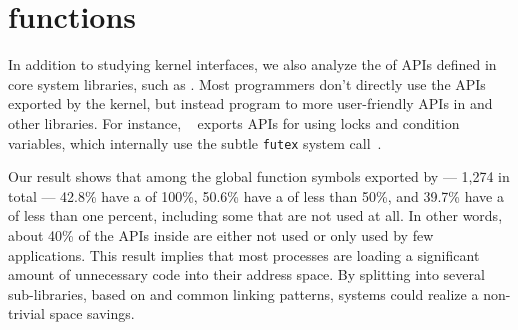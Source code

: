 


\section{\Libc{} functions}
\label{sec:study:libc}

In addition to studying kernel interfaces, we also analyze the \usagemetric{} of APIs
defined in core system libraries, such as \libc{}.
Most programmers don't directly use the APIs exported by the kernel,
but instead program to more user-friendly APIs in \libc{} and other libraries.
For instance, \glibc{}~\citep{glibc} exports APIs for using locks and condition variables, which internally 
use the subtle {\tt futex} system call~\citep{franke02futex}.

Our result shows that among %
the global function symbols exported by 
\libc{} --- 1,274 in total %
--- 42.8\% have a \usagemetric{} of 100\%,
50.6\% have a \usagemetric{} of less than 50\%,
and 39.7\% have a \usagemetric{} of less than one percent, including some that are not used at all.
In other words, about 40\% of the APIs inside \libc{}
are either not used or only used by few applications.
This result implies that most processes are loading a significant amount of 
unnecessary code into their address space.
By splitting \libc{} into several sub-libraries, based on \usagemetric{}
and common linking patterns, systems could realize a non-trivial space savings.


